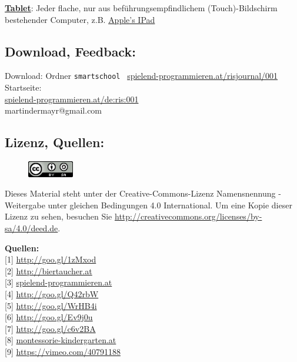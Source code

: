 \href{https://de.wikipedia.org/wiki/Tablet-Computer}{\textbf{Tablet}}: Jeder flache, nur aus beführungsempfindlichem (Touch)-Bildschirm bestehender Computer, z.B. \href{https://de.wikipedia.org/wiki/Apple_iPad}{Apple's IPad}


\subsection*{Download, Feedback:}
\footnotesize{
Download: Ordner \texttt{smartschool} \Mundus\ \href{http://spielend-programmieren.at/risjournal/001}{spielend-programmieren.at/risjournal/001}\\
Startseite:\\
\href{http://spielend-programmieren.at/de:ris:001}{spielend-programmieren.at/de:ris:001}\\ 
\Letter\: martindermayr@gmail.com\\}
\normalsize 

\subsection*{Lizenz, Quellen:}
\begin{figure}
\includegraphics[width=2cm]{smartschool/ccbysa88x31.png}
\end{figure}
Dieses Material steht unter der Creative-Commons-Lizenz Namensnennung - Weitergabe unter gleichen Bedingungen 4.0 International. Um eine Kopie dieser Lizenz zu sehen, besuchen Sie \url{http://creativecommons.org/licenses/by-sa/4.0/deed.de}.

\textbf{Quellen:} \\
{[}1{]} \url{http://goo.gl/1zMxod} \\
{[}2{]} \url{http://biertaucher.at} \\
{[}3{]} \href{http://spielend-programmieren.at}{spielend-programmieren.at} \\
{[}4{]} \url{http://goo.gl/Q42rbW} \\
{[}5{]} \url{http://goo.gl/WrHB4i} \\
{[}6{]} \url{http://goo.gl/Ev9j0u} \\
{[}7{]} \url{http://goo.gl/c6v2BA} \\
{[}8{]} \href{http://www.montessori-kindergarten.at/}{montessorie-kindergarten.at} \\
{[}9{]} \url{https://vimeo.com/40791188} 



